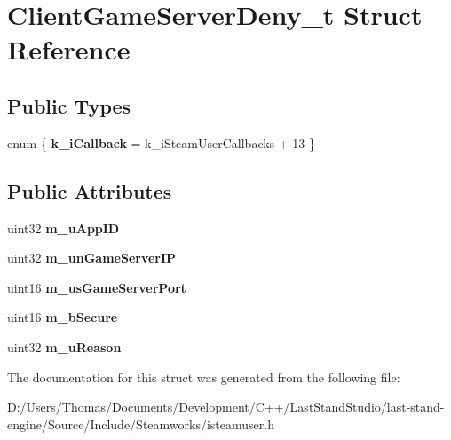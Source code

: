 \hypertarget{structClientGameServerDeny__t}{}\section{Client\+Game\+Server\+Deny\+\_\+t Struct Reference}
\label{structClientGameServerDeny__t}
\subsection*{Public Types}
\begin{DoxyCompactItemize}
\item 
\hypertarget{structClientGameServerDeny__t_a1e550a3e3aab6cb449248c85d27b134f}{}enum \{ {\bfseries k\+\_\+i\+Callback} = k\+\_\+i\+Steam\+User\+Callbacks + 13
 \}\label{structClientGameServerDeny__t_a1e550a3e3aab6cb449248c85d27b134f}

\end{DoxyCompactItemize}
\subsection*{Public Attributes}
\begin{DoxyCompactItemize}
\item 
\hypertarget{structClientGameServerDeny__t_a05a3e512cb312822b32304fcf76f93ef}{}uint32 {\bfseries m\+\_\+u\+App\+I\+D}\label{structClientGameServerDeny__t_a05a3e512cb312822b32304fcf76f93ef}

\item 
\hypertarget{structClientGameServerDeny__t_a36595fc514fb1465ce7fed234514ba69}{}uint32 {\bfseries m\+\_\+un\+Game\+Server\+I\+P}\label{structClientGameServerDeny__t_a36595fc514fb1465ce7fed234514ba69}

\item 
\hypertarget{structClientGameServerDeny__t_afadbe2993ae2464a40d24f82b1e9cfd1}{}uint16 {\bfseries m\+\_\+us\+Game\+Server\+Port}\label{structClientGameServerDeny__t_afadbe2993ae2464a40d24f82b1e9cfd1}

\item 
\hypertarget{structClientGameServerDeny__t_a924cb83dacac00b44b889e431c05902a}{}uint16 {\bfseries m\+\_\+b\+Secure}\label{structClientGameServerDeny__t_a924cb83dacac00b44b889e431c05902a}

\item 
\hypertarget{structClientGameServerDeny__t_a2acb2645bc0ad581a27d053f4535915a}{}uint32 {\bfseries m\+\_\+u\+Reason}\label{structClientGameServerDeny__t_a2acb2645bc0ad581a27d053f4535915a}

\end{DoxyCompactItemize}


The documentation for this struct was generated from the following file\+:\begin{DoxyCompactItemize}
\item 
D\+:/\+Users/\+Thomas/\+Documents/\+Development/\+C++/\+Last\+Stand\+Studio/last-\/stand-\/engine/\+Source/\+Include/\+Steamworks/isteamuser.\+h\end{DoxyCompactItemize}

